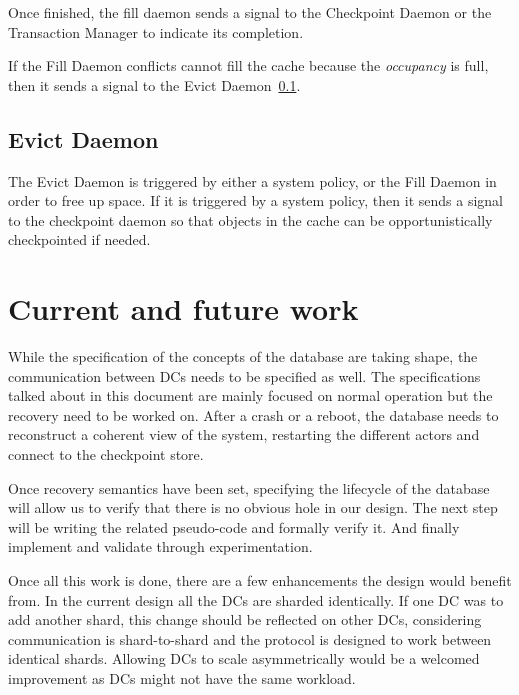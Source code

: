 \documentclass[twoside]{article}
\begin{document}
Once finished, the fill daemon sends a signal to the Checkpoint Daemon or the 
Transaction Manager to indicate its completion.

If the Fill Daemon conflicts cannot fill the cache because the \emph{occupancy}
is full, then it sends a signal to the Evict Daemon~\ref{sec:evict-daemon}.

\subsection{Evict Daemon}
\label{sec:evict-daemon}
 
The Evict Daemon is triggered by either a system policy, or the Fill Daemon in 
order to free up space. 
If it is triggered by a system policy, then it sends a signal to the 
checkpoint daemon so that objects in the cache can be opportunistically
checkpointed if needed.



\section{Current and future work}
\label{sec:current-future}

While the specification of the concepts of the database are taking shape, the
communication between DCs needs to be specified as well.
The specifications talked about in this document are mainly focused on normal
operation but the recovery need to be worked on. 
After a crash or a reboot, the database needs to reconstruct a coherent view of
the system, restarting the different actors and connect to the checkpoint store.

Once recovery semantics have been set, specifying the lifecycle of the
database will allow us to verify that there is no obvious hole in our design.
The next step will be writing the related pseudo-code and formally verify
it. 
And finally implement and validate through experimentation.

Once all this work is done, there are a few enhancements the design would benefit
from.
In the current design all the DCs are sharded identically. 
If one DC was to add another shard, this change should be reflected on other DCs,
considering communication is shard-to-shard and the protocol is designed to
work between identical shards.
Allowing DCs to scale asymmetrically would be a welcomed improvement as DCs
might not have the same workload.
\end{document}
